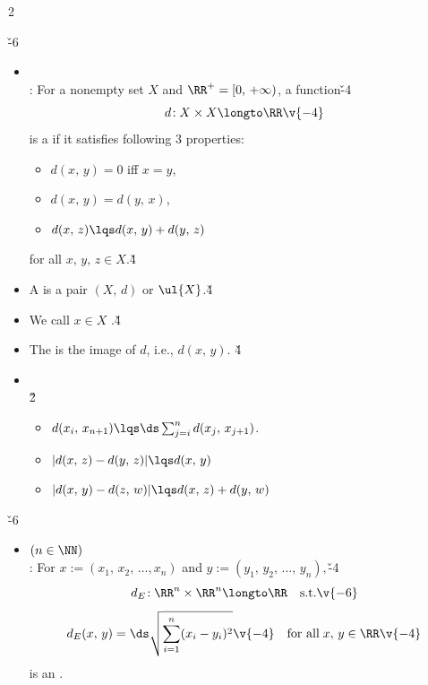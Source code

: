 \documentclass[dvipdfmx,a4paper,titlepage,9pt]{jsarticle}
\begin{document}
\begin{multicols*}{2}
\newpage


\v{-6}
\begin{itemize}[label=-]
\item{} \\
: For a nonempty set $X$ and $\RR^+=[0,\,+\infty)$, a function\v{-4}
$$d\!:X\times X\longto\RR\v{-4}$$
\;\;is a  if it satisfies following 3 properties:
\begin{itemize}
\setlength{\leftskip}{15pt}
\item[(M1)] $d(x,\,y)=0$ iff $x=y$,
\item[(M2)] $d(x,\,y)=d(y,\,x)$,
\item[(M3)] $d(x,\,z)\lqs d(x,\,y)+d(y,\,z)$
\end{itemize}
\;\;for all $x,\,y,\,z\in X$.\v4
\item A  is a pair $(X,\,d)$ or $\ul{X}$.\v4
\item We call $x\in X$ .\v4
\item The  is the image of $d$, i.e., $d(x,\,y)$. \v4
\item{} \\
{\small{}\v2}
\begin{itemize}[label={$\cdot$}]
\setlength{\leftskip}{-10pt}
\item$d(x_i,\,x_{n+1})\lqs\ds\sum_{j=i}^nd(x_j,\,x_{j+1})$.
\item$|d(x,\,z)-d(y,\,z)|\lqs d(x,\,y)$
\item$|d(x,\,y)-d(z,\,w)|\lqs d(x,\,z)+d(y,\,w)$
\end{itemize}
\end{itemize}

\;

\v{-6}
\begin{itemize}[label=-]
\item{} $(n\in\NN)$ \\
: For $x:=(x_1,\,x_2,\,\ldots,x_n)$ and $y:=(y_1,\,y_2,\,\ldots,\,y_n),$\v{-4}
$$d_E\!:\RR^n\times\RR^n\longto\RR\quad\text{s.t.}\v{-6}$$
$$d_E(x,\,y)=\ds\sqrt{\sum_{i=1}^n(x_i-y_i)^2}\v{-4}\quad\text{for all}\;x,\,y\in\RR\v{-4}$$
\;\;is an . \\


\end{itemize}
\end{multicols*}
\end{document}
